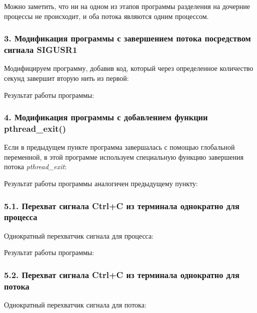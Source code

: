 \documentclass[14pt,a4paper,report]{report}
\begin{document}


Можно заметить, что ни на одном из этапов программы разделения на дочерние процессы не происходит, и оба потока являются одним процессом.

\subsubsection{3. Модификация программы с завершением потока посредством сигнала SIGUSR1}

Модифицируем программу, добавив код, который через определенное количество секунд завершит вторую нить из первой:



Результат работы программы:



\subsubsection{4. Модификация программы с добавлением  функции pthread\_exit()}

Если в предыдущем пункте программа завершалась с помощью глобальной переменной, в этой программе используем специальную функцию завершения потока \emph{pthread\_exit}:



Результат работы программы аналогичен предыдущему пункту:



\subsubsection{5.1. Перехват сигнала Ctrl+C из терминала однократно для процесса}

Однократный перехватчик сигнала для процесса:



Результат работы программы:



\subsubsection{5.2. Перехват сигнала Ctrl+C из терминала однократно для потока}

Однократный перехватчик сигнала для потока:
\end{document}
